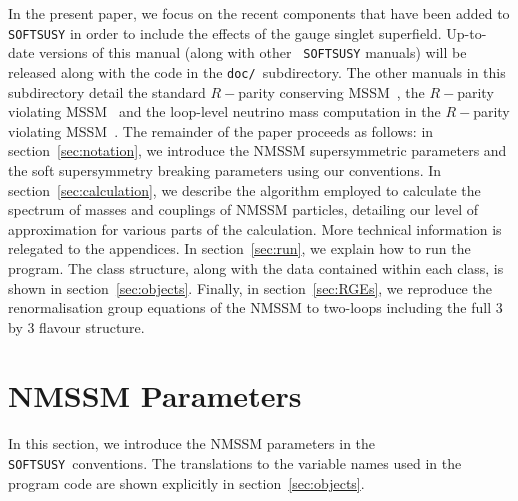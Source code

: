 \documentclass[final,3p,times,pdflatex]{elsarticle}
\def\SOFTSUSY{{\tt SOFTSUSY}}
\begin{document}
In the present paper, we focus on the recent components that have been added to
{\tt SOFTSUSY} in order to include the effects of the gauge singlet
superfield. Up-to-date versions of this manual (along with other {\tt
  SOFTSUSY} manuals) 
will be released along with the
code in the {\tt doc/}~subdirectory. The other manuals in this subdirectory detail the standard
$R-$parity conserving MSSM~\cite{Allanach:2001kg}, 
the $R-$parity violating MSSM~\cite{Allanach:2009bv} and the loop-level
neutrino mass 
computation in the $R-$parity violating MSSM~\cite{Allanach:2011de}.
The remainder of the paper proceeds as follows: in section~\ref{sec:notation}, we
introduce the NMSSM supersymmetric parameters and the soft supersymmetry
breaking 
parameters using our conventions.  In section~\ref{sec:calculation}, we describe
the algorithm 
employed to calculate the spectrum of masses and couplings of NMSSM
particles, detailing our level of approximation for various parts of the
calculation. More technical information is relegated to the appendices. In
section~\ref{sec:run}, we explain how to run the program. The class structure,
along with the data contained within each class, is shown in
section~\ref{sec:objects}. Finally, in section~\ref{sec:RGEs}, we reproduce
the renormalisation group equations of the NMSSM to two-loops including the
full 3 by 3 flavour structure. 

\section{NMSSM Parameters \label{sec:notation}}

In this section, we introduce the NMSSM parameters
in the \SOFTSUSY~conventions. The translations to the variable
names used in the program code are shown explicitly in
section~\ref{sec:objects}.  
\end{document}

